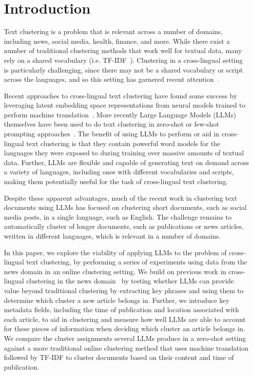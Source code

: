 \section{Introduction}\label{section:introduction}

Text clustering is a problem that is relevant across a number of domains, including news, social media, health, finance, and more.
While there exist a number of traditional clustering methods that work well for textual data, many rely on a shared vocabulary (i.e. TF-IDF~\cite{salton-buckley}).
Clustering in a cross-lingual setting is particularly challenging, since there may not be a shared vocabulary or script across the languages, and so this setting has garnered recent attention~\cite{Schneider2023}.

Recent approaches to cross-lingual text clustering have found some success by leveraging latent embedding space representations from neural models trained to perform machine translation~\cite{Schw18, Hong17,Pire19, Amma18}.
More recently Large Language Models (LLMs) themselves have been used to do text clustering in zero-shot or few-shot prompting approaches~\cite{Zhang2023clusterllm, Viswanathan2024}.
The benefit of using LLMs to perform or aid in cross-lingual text clustering is that they contain powerful word models for the languages they were exposed to during training over massive amounts of textual data.
Further, LLMs are flexible and capable of generating text on demand across a variety of languages, including ones with different vocabularies and scripts, making them potentially useful for the task of cross-lingual text clustering.

Despite these apparent advantages, much of the recent work in clustering text documents using LLMs has focused on clustering short documents, such as social media posts, in a single language, such as English.
The challenge remains to automatically cluster of longer documents, such as publications or news articles, written in different languages, which is relevant in a number of domains.

In this paper, we explore the viability of applying LLMs to the problem of cross-lingual text clustering, by performing a series of experiments using data from the news domain in an online clustering setting.
We build on previous work in cross-lingual clustering in the news domain~\cite{Schneider2023} by testing whether LLMs can provide value beyond traditional clustering by extracting key phrases and using them to determine which cluster a new article belongs in.
Further, we introduce key metadata fields, including the time of publication and location associated with each article, to aid in clustering and measure how well LLMs are able to account for these pieces of information when deciding which cluster an article belongs in.
We compare the cluster assignments several LLMs produce in a zero-shot setting against a more traditional online clustering method that uses machine translation followed by TF-IDF to cluster documents based on their content and time of publication.

